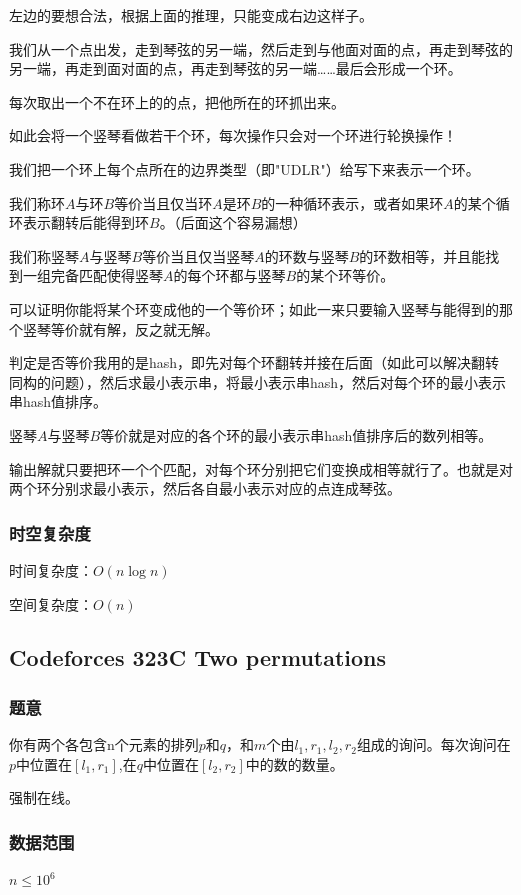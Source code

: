 \documentclass{ctexart}
\begin{document}
左边的要想合法，根据上面的推理，只能变成右边这样子。

我们从一个点出发，走到琴弦的另一端，然后走到与他面对面的点，再走到琴弦的另一端，再走到面对面的点，再走到琴弦的另一端……最后会形成一个环。

每次取出一个不在环上的的点，把他所在的环抓出来。

如此会将一个竖琴看做若干个环，每次操作只会对一个环进行轮换操作！

我们把一个环上每个点所在的边界类型（即"UDLR"）给写下来表示一个环。

我们称环$A$与环$B$等价当且仅当环$A$是环$B$的一种循环表示，或者如果环$A$的某个循环表示翻转后能得到环$B$。（后面这个容易漏想）

我们称竖琴$A$与竖琴$B$等价当且仅当竖琴$A$的环数与竖琴$B$的环数相等，并且能找到一组完备匹配使得竖琴$A$的每个环都与竖琴$B$的某个环等价。

可以证明你能将某个环变成他的一个等价环；如此一来只要输入竖琴与能得到的那个竖琴等价就有解，反之就无解。

判定是否等价我用的是hash，即先对每个环翻转并接在后面（如此可以解决翻转同构的问题），然后求最小表示串，将最小表示串hash，然后对每个环的最小表示串hash值排序。

竖琴$A$与竖琴$B$等价就是对应的各个环的最小表示串hash值排序后的数列相等。

输出解就只要把环一个个匹配，对每个环分别把它们变换成相等就行了。也就是对两个环分别求最小表示，然后各自最小表示对应的点连成琴弦。
\subsubsection{时空复杂度}
时间复杂度：$O(n \log n)$

空间复杂度：$O(n)$
\subsection{Codeforces 323C Two permutations}
\subsubsection{题意}
你有两个各包含n个元素的排列$p$和$q$，和$m$个由$l_1,r_1,l_2,r_2$组成的询问。每次询问在$p$中位置在$[l_1,r_1]$,在$q$中位置在$[l_2,r_2]$中的数的数量。

强制在线。
\subsubsection{数据范围}
$n \le 10^6$
\end{document}
